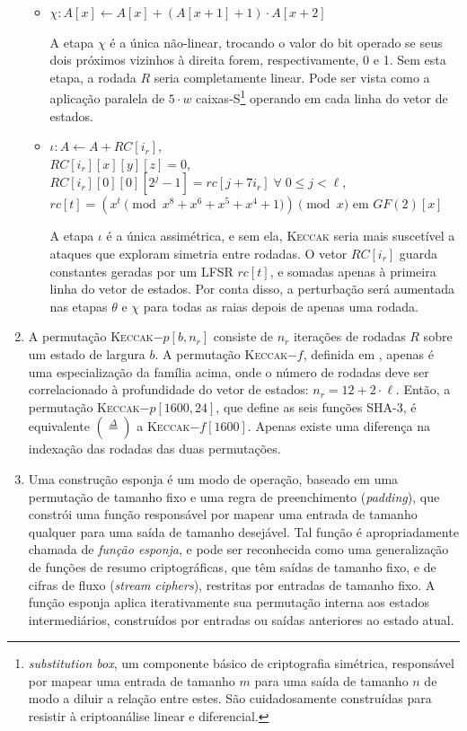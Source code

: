 \documentclass{article}
\begin{document}
\begin{enumerate}[label=(\alph*)]
\begin{itemize}
\item $\chi : A[x] \longleftarrow A[x] + (A[x + 1] + 1) \cdot A[x + 2]$

A etapa $\chi$ é a única não-linear, trocando o valor do bit operado se seus
dois próximos vizinhos à direita forem, respectivamente, 0 e 1. Sem esta
etapa, a rodada $R$ seria completamente linear. Pode ser vista como a
aplicação paralela de $5 \cdot w$ caixas-S\footnote{\emph{substitution box},
um componente básico de criptografia simétrica, responsável por mapear uma
entrada de tamanho $m$ para uma saída de tamanho $n$ de modo a diluir a
relação entre estes. São cuidadosamente construídas para resistir à
criptoanálise linear e diferencial.} operando em cada linha do vetor de
estados.

\item $\iota : A \longleftarrow A + RC[i_r]$, \\
    $RC[i_r][x][y][z] = 0$, \\
    $RC[i_r][0][0][2^j - 1] = rc[j + 7i_r] \; \forall \; 0 \leq j < \ell$, \\
    $rc[t] = (x^t \pmod{x^8 + x^6 + x^5 + x^4 + 1}) \pmod{x}$ em $GF(2)[x]$

A etapa $\iota$ é a única assimétrica, e sem ela, \textsc{Keccak} seria mais
suscetível a ataques que exploram simetria entre rodadas. O vetor $RC[i_r]$
guarda constantes geradas por um LFSR $rc[t]$, e somadas apenas à primeira
linha do vetor de estados. Por conta disso, a perturbação será aumentada nas
etapas $\theta$ e $\chi$ para todas as raias depois de apenas uma rodada.

\end{itemize}

\item A permutação \textsc{Keccak}$-p[b, n_r]$ consiste de $n_r$ iterações
de rodadas $R$ sobre um estado de largura $b$. A permutação
\textsc{Keccak}$-f$, definida em \cite{KeccakReference}, apenas é uma
especialização da família acima, onde o número de rodadas deve ser
correlacionado à profundidade do vetor de estados: $n_r = 12 + 2 \cdot \ell$.
Então, a permutação \textsc{Keccak}$-p[1600, 24]$, que define as seis funções
SHA-3, é equivalente $(\stackrel{\Delta}{=})$ a \textsc{Keccak}$-f[1600]$.
Apenas existe uma diferença na indexação das rodadas das duas permutações.

\item \label{f} Uma construção esponja é um modo de operação, baseado em uma
permutação de tamanho fixo e uma regra de preenchimento (\emph{padding}), que
constrói uma função responsável por mapear uma entrada de tamanho qualquer
para uma saída de tamanho desejável. Tal função é apropriadamente chamada de
\emph{função esponja}, e pode ser reconhecida como uma generalização de
funções de resumo criptográficas, que têm saídas de tamanho fixo, e de cifras
de fluxo (\emph{stream ciphers}), restritas por entradas de tamanho fixo. A
função esponja aplica iterativamente sua permutação interna aos estados
intermediários, construídos por entradas ou saídas anteriores ao estado atual.


\end{enumerate}
\end{document}
